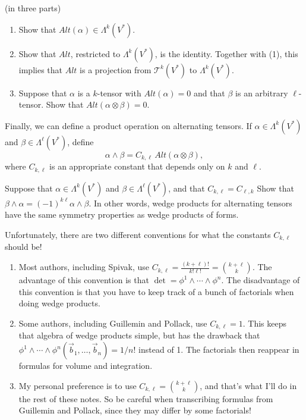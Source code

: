 \documentclass[12pt]{amsbook}
\newcommand{\T}{{\mathcal T}}
\theoremstyle{definition}
\begin{document}
\smallskip
{} (in three parts) 
\begin{enumerate}
\item Show that $Alt(\alpha) \in \Lambda^k(V^*)$. 
\item Show that $Alt$, restricted to $\Lambda^k(V^*)$, is the identity.
Together with (1), this implies that $Alt$ is a projection from 
$\T^k(V^*)$ to $\Lambda^k(V^*)$.  
\item Suppose that $\alpha$ is a $k$-tensor with $Alt(\alpha)=0$ and that 
$\beta$ is an arbitrary $\ell$-tensor. Show that $Alt(\alpha \otimes \beta)=0$.
\end{enumerate}

\smallskip

Finally, we can define a product operation on alternating tensors. If
$\alpha \in \Lambda^k(V^*)$ and $\beta \in \Lambda^\ell(V^*)$, define
$$ \alpha \wedge \beta = C_{k,\ell} \, Alt(\alpha \otimes \beta),$$
where $C_{k,\ell}$ is an appropriate constant that depends only on $k$ 
and $\ell$.  

\smallskip

 Suppose that $\alpha \in \Lambda^k(V^*)$ and 
$\beta \in \Lambda^\ell(V^*)$, and that 
$C_{k,\ell}=C_{\ell,k}$ Show that $\beta \wedge \alpha = (-1)^{k\ell}
\alpha \wedge \beta$. In other words, wedge products for alternating tensors
have the same symmetry properties as wedge products of forms.  

\smallskip

Unfortunately, there are two different conventions for what the constants
$C_{k,\ell}$ should be! 
\begin{enumerate} 
\item Most authors, including Spivak, use $C_{k,\ell} = 
\frac{(k+\ell)!}{k!\ell!} = { k+\ell \choose k}$. 
The advantage of this convention is that 
$\det = \phi^1 \wedge \cdots \wedge \phi^n$. The disadvantage of this convention
is that you have to keep track of a bunch of factorials when doing wedge 
products.  
\item Some authors, including Guillemin and Pollack, use $C_{k,\ell}=1$. 
This keeps that algebra of wedge products simple, but has the drawback that
$\phi^1\wedge\cdots\wedge \phi^n(\vec b_1,\ldots, \vec b_n) = 1/n!$ instead of 
1. The factorials then reappear in formulas for volume and integration.
\item My personal preference is to use $C_{k,\ell}= {k+\ell \choose k}$, and
that's what I'll do in the rest of these notes. So be careful when 
transcribing formulas from Guillemin and Pollack, since they may differ 
by some factorials! 
\end{enumerate}
\end{document}
